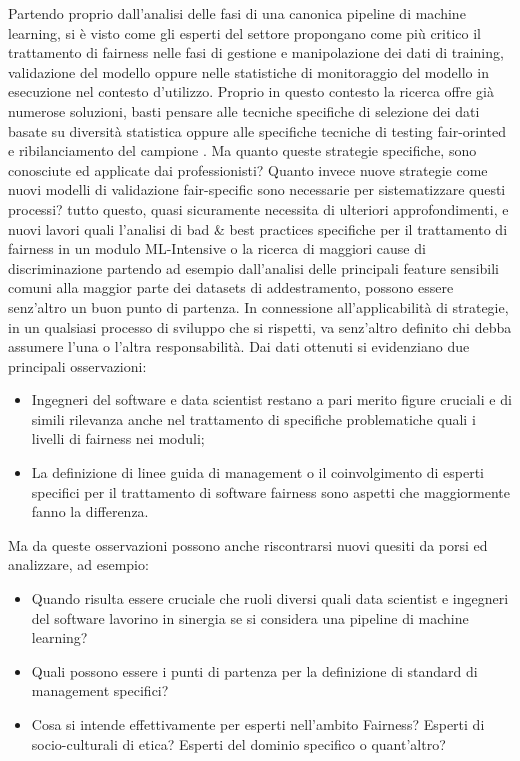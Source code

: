     Partendo proprio dall'analisi delle fasi di una canonica pipeline di machine learning, si è visto come gli esperti del settore propongano come più critico il trattamento di fairness nelle fasi di gestione e manipolazione dei dati di training, validazione del modello oppure nelle statistiche di monitoraggio del modello in esecuzione nel contesto d'utilizzo. Proprio in questo contesto la ricerca offre già numerose soluzioni, basti pensare alle tecniche specifiche di selezione dei dati basate su diversità statistica \cite{moumoulidou2020diverse} oppure alle specifiche tecniche di testing fair-orinted e ribilanciamento del campione \cite{galhotra2017fairness}. Ma quanto queste strategie specifiche, sono conosciute ed applicate dai professionisti? Quanto invece nuove strategie come nuovi modelli di validazione fair-specific sono necessarie per sistematizzare questi processi? tutto questo, quasi sicuramente necessita di ulteriori approfondimenti, e nuovi lavori quali l'analisi di bad \& best practices specifiche per il trattamento di fairness in un modulo ML-Intensive o la ricerca di maggiori cause di discriminazione partendo ad esempio dall'analisi delle principali feature sensibili comuni alla maggior parte dei datasets di addestramento, possono essere senz'altro un buon punto di partenza. In connessione all'applicabilità di strategie, in un qualsiasi processo di sviluppo che si rispetti, va senz'altro definito chi debba assumere l'una o l'altra responsabilità. Dai dati ottenuti si evidenziano due principali osservazioni:
    \begin{itemize}
        \item  Ingegneri del software e data scientist restano a pari merito figure cruciali e di simili rilevanza anche nel trattamento di specifiche problematiche quali i livelli di fairness nei moduli;
        \item La definizione di linee guida di management o il coinvolgimento di esperti specifici per il trattamento di software fairness sono aspetti che maggiormente fanno la differenza.
    \end{itemize}
    
    Ma da queste osservazioni possono anche riscontrarsi nuovi quesiti da porsi ed analizzare, ad esempio:
    
    \begin{itemize}
        \item Quando risulta essere cruciale che ruoli diversi quali data scientist e ingegneri del software lavorino in sinergia se si considera una pipeline di machine learning?
        \item Quali possono essere i punti di partenza per la definizione di standard di management specifici?
        \item Cosa si intende effettivamente per esperti nell'ambito Fairness? Esperti di socio-culturali di etica? Esperti del dominio specifico o quant'altro?
    \end{itemize}
    
